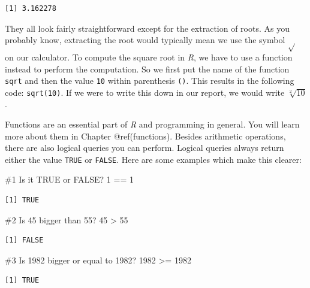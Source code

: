 \documentclass[
  letterpaper,
]{krantz}
\makeatletter
\newenvironment{Shaded}{\begin{snugshade}}{\end{snugshade}}
\newcommand{\CommentTok}[1]{\textcolor[rgb]{0.37,0.37,0.37}{#1}}
\newcommand{\DecValTok}[1]{\textcolor[rgb]{0.68,0.00,0.00}{#1}}
\newcommand{\SpecialCharTok}[1]{\textcolor[rgb]{0.37,0.37,0.37}{#1}}
\newenvironment{kframe}{%
\medskip{}
\setlength{\fboxsep}{.8em}
 \def\at@end@of@kframe{}%
 \ifinner\ifhmode%
  \def\at@end@of@kframe{\end{minipage}}%
  \begin{minipage}{\columnwidth}%
 \fi\fi%
 \def\FrameCommand##1{\hskip\@totalleftmargin \hskip-\fboxsep
 \colorbox{shadecolor}{##1}\hskip-\fboxsep
     \hskip-\linewidth \hskip-\@totalleftmargin \hskip\columnwidth}%
 \MakeFramed {\advance\hsize-\width
   \@totalleftmargin\z@ \linewidth\hsize
   \@setminipage}}%
 {\par\unskip\endMakeFramed%
 \at@end@of@kframe}
\renewenvironment{Shaded}{\begin{kframe}}{\end{kframe}}
\makeatother
\begin{document}
\begin{verbatim}
[1] 3.162278
\end{verbatim}

They all look fairly straightforward except for the extraction of roots.
As you probably know, extracting the root would typically mean we use
the symbol \(\sqrt{}\) on our calculator. To compute the square root in
\emph{R}, we have to use a function instead to perform the computation.
So we first put the name of the function \texttt{sqrt} and then the
value \texttt{10} within parenthesis \texttt{()}. This results in the
following code: \texttt{sqrt(10)}. If we were to write this down in our
report, we would write \(\sqrt[2]{10}\).

Functions are an essential part of \emph{R} and programming in general.
You will learn more about them in Chapter @ref(functions). Besides
arithmetic operations, there are also logical queries you can perform.
Logical queries always return either the value \texttt{TRUE} or
\texttt{FALSE}. Here are some examples which make this clearer:

\begin{Shaded}
\begin{Highlighting}[]
\CommentTok{\#1 Is it TRUE or FALSE?}
\DecValTok{1} \SpecialCharTok{==} \DecValTok{1}
\end{Highlighting}
\end{Shaded}

\begin{verbatim}
[1] TRUE
\end{verbatim}

\begin{Shaded}
\begin{Highlighting}[]
\CommentTok{\#2 Is 45 bigger than 55?}
\DecValTok{45} \SpecialCharTok{\textgreater{}} \DecValTok{55}
\end{Highlighting}
\end{Shaded}

\begin{verbatim}
[1] FALSE
\end{verbatim}

\begin{Shaded}
\begin{Highlighting}[]
\CommentTok{\#3 Is 1982 bigger or equal to 1982?}
\DecValTok{1982} \SpecialCharTok{\textgreater{}=} \DecValTok{1982}
\end{Highlighting}
\end{Shaded}

\begin{verbatim}
[1] TRUE
\end{verbatim}
\end{document}
